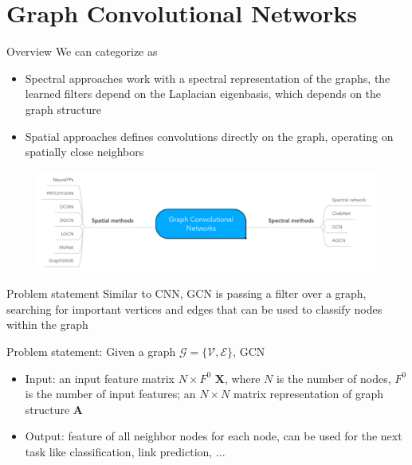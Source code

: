 \documentclass[notheorems, aspectratio=54]{beamer}
\begin{document}
	\section{Graph Convolutional Networks}
	\begin{frame}{Overview}
		We can categorize as
		\begin{itemize}
			\item Spectral approaches work with a spectral representation of the graphs, the learned filters depend on the Laplacian eigenbasis, which depends on the graph structure \cite{intrognn2020}
			\item Spatial approaches defines convolutions directly on the graph, operating on spatially close neighbors \cite{intrognn2020}
		\end{itemize}
		\begin{figure}[H]
			\centering
			\includegraphics[width=1\linewidth]{figs/mindmap.png}
			\label{fig:writing-thesis}
		\end{figure}
	\end{frame}
	\begin{frame}{Problem statement}
		Similar to CNN, GCN is passing a filter over a graph, searching for important vertices and edges that can be used to classify nodes within the graph
		
		Problem statement: Given a graph $\mathcal{G} = \{\mathcal{V}, \mathcal{E}\}$, GCN
		\begin{itemize}
			\item Input: an input feature matrix $N \times F^{0}$ $\mathbf{X}$, where $N$ is the number of nodes, $ F^{0}$ is the number of input features; an $N \times N$ matrix representation of graph structure $\mathbf{A}$
			\item Output: feature of all neighbor nodes for each node, can be used for the next task like classification, link prediction, ...
		\end{itemize}
	\end{frame}
\end{document}
